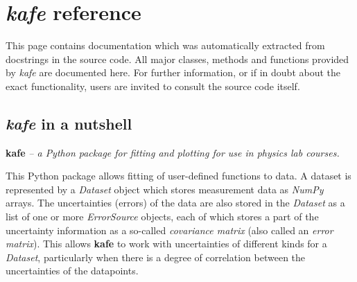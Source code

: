 \documentclass[a4paper,10pt,english]{sphinxmanual}
\begin{document}
\chapter{\emph{kafe} reference}
\label{module_doc:kafe-reference}\label{module_doc::doc}
This page contains documentation which was automatically extracted from
docstrings in the source code. All major classes, methods and functions
provided by \emph{kafe} are documented here. For further information, or if in
doubt about the exact functionality, users are invited to consult the source
code itself.


\section{\emph{kafe} in a nutshell}
\label{module_doc:module-kafe.__init__}\label{module_doc:kafe-in-a-nutshell}
\textbf{kafe} \emph{-- a Python package for fitting and plotting for use in physics lab
courses.}

This Python package allows fitting of user-defined functions to data. A dataset
is represented by a \emph{Dataset} object which stores measurement data as \emph{NumPy}
arrays. The uncertainties (errors) of the data are also stored in the \emph{Dataset}
as a list of one or more \emph{ErrorSource} objects, each of which stores a part of
the uncertainty information as a so-called \emph{covariance matrix} (also called an
\emph{error matrix}). This allows \textbf{kafe} to work with uncertainties of different
kinds for a \emph{Dataset}, particularly when there is a degree of correlation
between the uncertainties of the datapoints.
\end{document}
